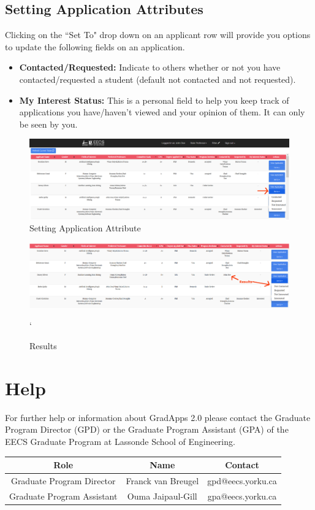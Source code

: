 \documentclass[fontsize=12pt,paper=letter,twoside]{scrartcl}
\begin{document}
\subsection{Setting Application Attributes}
Clicking on the ``Set To" drop down on an applicant row will provide you options to update the following fields on an application.
\begin{itemize}
\item \textbf{Contacted/Requested:} Indicate to others whether or not you have contacted/requested a student (default not contacted and not requested).
\item \textbf{My Interest Status:} This is a personal field to help you keep track of applications you have/haven't viewed and your opinion of them. It can only be seen by you.
\end{itemize}

\begin{figure}[!htb]
\begin{center}
\includegraphics[width=.99\textwidth]{images/prof/set_attribute.png}
\end{center}
\caption{Setting Application Attribute}
\label{fig:prof/set_attribute}
\end{figure}

\begin{figure}[!htb]
\begin{center}
\includegraphics[width=.99\textwidth]{images/prof/set_attribute2.png}
\end{center}`
\caption{Results}
\label{fig:prof/set_attribute_results}
\end{figure}

\clearpage
\newpage
\section{Help}
For further help or information about GradApps 2.0 please contact the Graduate Program Director (GPD) or the Graduate Program Assistant (GPA) of the EECS Graduate Program at Lassonde School of Engineering.\\

\begin{center}
\begin{tabular}{ |c |c |c | } \hline
 \textbf{Role} & \textbf{Name} & \textbf{Contact} \\ \hline
 Graduate Program Director & Franck van Breugel & gpd@eecs.yorku.ca \\ \hline
 Graduate Program Assistant & Ouma Jaipaul-Gill & gpa@eecs.yorku.ca \\ \hline
\end{tabular}
\end{center}
\end{document}
